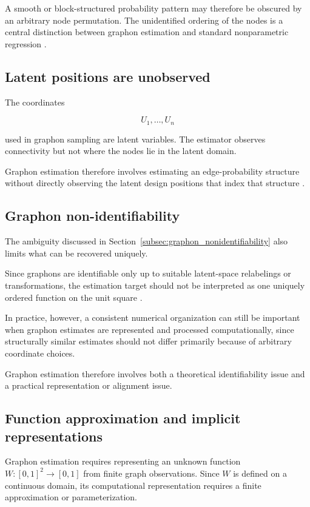 A smooth or block-structured probability pattern may therefore be obscured by an arbitrary node permutation. The unidentified ordering of the nodes is a central distinction between graphon estimation and standard nonparametric regression \cite{gao2015rate}.


\subsection{Latent positions are unobserved}
\label{subsec:latent_positions}

The coordinates

\[
U_1,\ldots,U_n
\]

used in graphon sampling are latent variables. The estimator observes connectivity but not where the nodes lie in the latent domain.

Graphon estimation therefore involves estimating an edge-probability structure without directly observing the latent design positions that index that structure \cite{gao2015rate}.


\subsection{Graphon non-identifiability}
\label{subsec:estimation_nonidentifiability}

The ambiguity discussed in Section~\ref{subsec:graphon_nonidentifiability} also limits what can be recovered uniquely.

Since graphons are identifiable only up to suitable latent-space relabelings or transformations, the estimation target should not be interpreted as one uniquely ordered function on the unit square \cite{lovasz2006limits,gao2015rate}.

In practice, however, a consistent numerical organization can still be important when graphon estimates are represented and processed computationally, since structurally similar estimates should not differ primarily because of arbitrary coordinate choices.

Graphon estimation therefore involves both a theoretical identifiability issue and a practical representation or alignment issue.


\subsection{Function approximation and implicit representations}
\label{subsec:implicit_representations}

Graphon estimation requires representing an unknown function \(W:[0,1]^2\to[0,1]\) from finite graph observations. Since \(W\) is defined on a continuous domain, its computational representation requires a finite approximation or parameterization.

